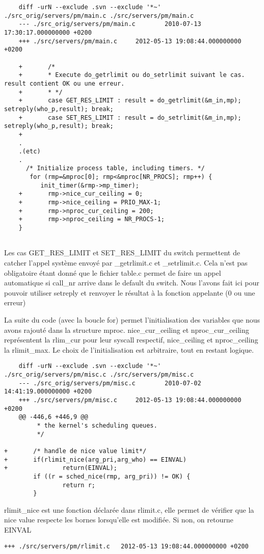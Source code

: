 \documentclass[9pt , a4paper]{report}
\begin{document}
	\begin{lstlisting}
	diff -urN --exclude .svn --exclude '*~' ./src_orig/servers/pm/main.c ./src/servers/pm/main.c
	--- ./src_orig/servers/pm/main.c        2010-07-13 17:30:17.000000000 +0200	
	+++ ./src/servers/pm/main.c     2012-05-13 19:08:44.000000000 +0200
	
	+       /*
	+       * Execute do_getrlimit ou do_setrlimit suivant le cas. result contient OK ou une erreur. 
	+       * */
	+       case GET_RES_LIMIT : result = do_getrlimit(&m_in,mp); setreply(who_p,result); break;
	+       case SET_RES_LIMIT : result = do_setrlimit(&m_in,mp); setreply(who_p,result); break;
	+       
	. 
	.(etc)
	.
	  /* Initialize process table, including timers. */
	   for (rmp=&mproc[0]; rmp<&mproc[NR_PROCS]; rmp++) {
      	  init_timer(&rmp->mp_timer);
	+       rmp->nice_cur_ceiling = 0;
	+       rmp->nice_ceiling = PRIO_MAX-1;
	+       rmp->nproc_cur_ceiling = 200;
	+       rmp->nproc_ceiling = NR_PROCS-1;
   	}
	     
	\end{lstlisting}
	Les cas GET\_RES\_LIMIT et SET\_RES\_LIMIT du switch permettent de catcher l'appel système envoyé par 		\_getrlimit.c et 	\_setrlimit.c. Cela n'est pas obligatoire étant donné que le fichier table.c permet de faire un appel automatique si call\_nr 	arrive dans le default du switch. Nous l'avons fait ici pour pouvoir utiliser setreply et renvoyer le résultat à la fonction	 appelante (0 ou une erreur)
	
	La suite du code (avec la boucle for) permet l'initialisation des variables que nous avons rajouté dans la structure 			mproc. nice\_cur\_ceiling et nproc\_cur\_ceiling représentent la rlim\_cur pour leur syscall respectif, nice\_ceiling et 		nproc\_ceiling la rlimit\_max. Le choix de l'initialisation est arbitraire, tout en restant logique.
	
		\begin{lstlisting}
	diff -urN --exclude .svn --exclude '*~' ./src_orig/servers/pm/misc.c ./src/servers/pm/misc.c
	--- ./src_orig/servers/pm/misc.c        2010-07-02 14:41:19.000000000 +0200
	+++ ./src/servers/pm/misc.c     2012-05-13 19:08:44.000000000 +0200
	@@ -446,6 +446,9 @@
         * the kernel's scheduling queues.
         */

+       /* handle de nice value limit*/
+       if(rlimit_nice(arg_pri,arg_who) == EINVAL)
+               return(EINVAL);
        if ((r = sched_nice(rmp, arg_pri)) != OK) {
                return r;
        }
	\end{lstlisting}
	rlimit\_nice est une fonction déclarée dans rlimit.c, elle permet de vérifier que la nice value respecte les bornes lorsqu'elle est modifiée. Si non, on retourne EINVAL
\begin{lstlisting}
+++ ./src/servers/pm/rlimit.c   2012-05-13 19:08:44.000000000 +0200
\end{lstlisting}
\end{document}
